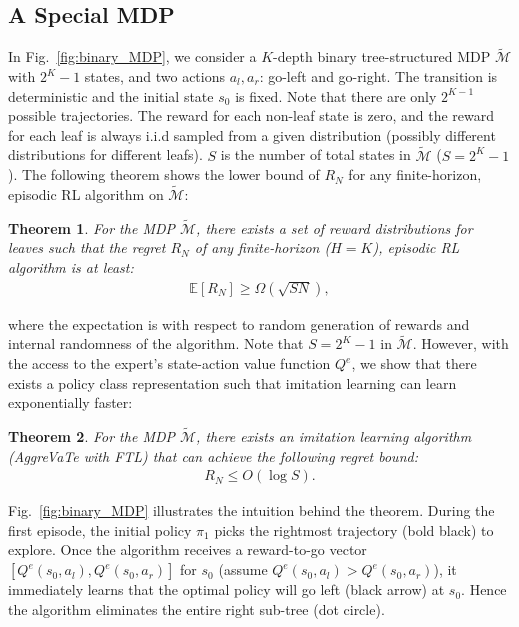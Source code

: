 \documentclass{article}
\newtheorem{theorem}{Theorem}[section]
\begin{document}
\subsection{A Special MDP}
\label{sec:special_mdp}
In Fig.~\ref{fig:binary_MDP}, we consider a $K$-depth binary tree-structured MDP $\tilde{\mathcal{M}}$ with $2^K-1$ states, and two actions ${a_l, a_r}$:  go-left and go-right. The transition is deterministic and the initial state $s_0$ is fixed. Note that there are only $2^{K-1}$ possible trajectories. The reward for each non-leaf state is zero, and the reward for each leaf is always i.i.d sampled from a given distribution (possibly different distributions for different leafs).  $S$ is the number of total states in $\tilde{\mathcal{M}}$ ($S = 2^K-1$). The following theorem shows the lower bound of $R_N$ for any finite-horizon, episodic RL algorithm on $\tilde{\mathcal{M}}$:
\begin{theorem}
\label{them:special_lower}
For the MDP $\tilde{\mathcal{M}}$, there exists a set of reward distributions for leaves such that  the regret $R_N$ of any finite-horizon ($H=K$), episodic RL algorithm is at least:
\begin{align}
\mathbb{E}[R_N] \geq \Omega(\sqrt{SN}),
\end{align} 
\end{theorem} where the expectation is with respect to random generation of rewards and internal randomness of the algorithm. Note that $S = 2^K-1$ in $\tilde{\mathcal{M}}$.
However, with the access to the expert's state-action value function $Q^e$, we show that there exists a policy class representation such that imitation learning can learn exponentially faster:%
\begin{theorem}
\label{them:special_upper}
For the MDP $\tilde{\mathcal{M}}$, there exists an imitation learning algorithm (AggreVaTe with FTL) that can achieve the following regret bound:
\begin{align}
R_N \leq O(\log{S}).
\end{align}
\end{theorem}
Fig.~\ref{fig:binary_MDP} illustrates the intuition behind the theorem. During the first episode, the initial policy $\pi_1$ picks the rightmost trajectory (bold black) to explore. Once the algorithm receives a reward-to-go vector $[Q^e(s_0,a_l),Q^e(s_0,a_r)]$ for $s_0$ (assume $Q^e(s_0,a_l)>Q^e(s_0,a_r)$), it immediately learns that the optimal policy will go left (black arrow) at $s_0$. Hence the algorithm eliminates the entire right sub-tree (dot circle).
\end{document}
